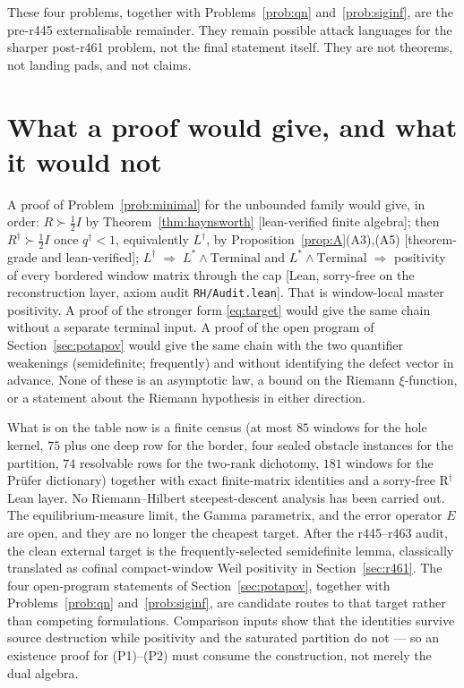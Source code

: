 \documentclass[11pt]{article}
\theoremstyle{remark}
\newcommand{\Rd}{R^{\dagger}}
\newcommand{\Ld}{L^{\dagger}}
\newcommand{\Ls}{L^{*}}
\newcommand{\half}{\tfrac12}
\newcommand{\gr}[1]{\textnormal{\small[#1]}}
\begin{document}
These four problems, together with
Problems~\ref{prob:qn} and~\ref{prob:siginf}, are the
pre-r445 externalisable remainder.  They remain possible attack
languages for the sharper post-r461 problem, not the final
statement itself.  They are not theorems, not landing pads, and
not claims.

\section{What a proof would give, and what it would not}\label{sec:status}

A proof of Problem~\ref{prob:minimal} for the unbounded family
would give, in order:
$R\succ\half I$
by Theorem~\ref{thm:haynsworth} \gr{lean-verified finite algebra};
then $\Rd\succ\half I$ once $q^{\dagger}<1$, equivalently $\Ld$,
by Proposition~\ref{prop:A}(A3),(A5)
\gr{theorem-grade and lean-verified};
$\Ld\;\Rightarrow\;\Ls\wedge\mathrm{Terminal}$
and
$\Ls\wedge\mathrm{Terminal}\;\Rightarrow$
positivity of every bordered window matrix through the cap
\gr{Lean, sorry-free on the reconstruction layer, axiom audit
\texttt{RH/Audit.lean}}.  That is window-local master positivity.
A proof of the stronger form \eqref{eq:target} would give the same
chain without a separate terminal input.  A proof of the open
program of Section~\ref{sec:potapov} would give the same chain
with the two quantifier weakenings (semidefinite; frequently)
and without identifying the defect vector in advance.
None of these is an asymptotic law, a bound on the Riemann
$\xi$-function, or a statement about the Riemann hypothesis in
either direction.

What is on the table now is a finite census (at most $85$ windows
for the hole kernel, $75$ plus one deep row for the border, four
sealed obstacle instances for the partition, $74$ resolvable rows
for the two-rank dichotomy, $181$ windows for the Pr\"ufer
dictionary) together with exact finite-matrix identities and a
sorry-free R$^{\dagger}$ Lean layer.  No Riemann--Hilbert
steepest-descent analysis has been carried out.  The
equilibrium-measure limit, the Gamma parametrix, and the error
operator $E$ are open, and they are no longer the cheapest target.
After the r445--r463 audit, the clean external target is the
frequently-selected semidefinite lemma, classically translated as
cofinal compact-window Weil positivity in
Section~\ref{sec:r461}.  The four open-program statements of
Section~\ref{sec:potapov}, together with
Problems~\ref{prob:qn} and~\ref{prob:siginf}, are candidate routes
to that target rather than competing formulations.
Comparison inputs show that the identities survive source
destruction while positivity and the saturated partition do not
--- so an existence proof for (P1)--(P2) must consume the
construction, not merely the dual algebra.
\end{document}
